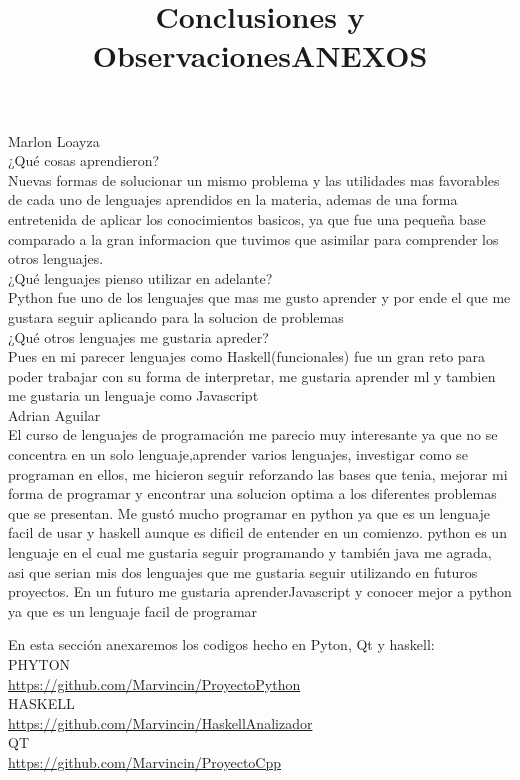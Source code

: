 \documentclass[12pt]{extbook}
\begin{document}
\newpage
\begin{center}
\title{Conclusiones y Observaciones}\maketitle
\end{center}
Marlon Loayza\\
¿Qué cosas aprendieron?\\
Nuevas formas de solucionar un mismo problema y las utilidades mas favorables de cada uno de 
lenguajes aprendidos en la materia, ademas de una forma entretenida de aplicar los conocimientos
basicos, ya que fue una pequeña base comparado a la gran informacion que tuvimos que asimilar
para comprender los otros lenguajes.\\
¿Qué lenguajes pienso utilizar en adelante?\\
Python fue uno de los lenguajes que mas me gusto aprender y por ende el que me gustara seguir
aplicando para la solucion de problemas\\
¿Qué otros lenguajes me gustaria apreder?\\
Pues en mi parecer lenguajes como Haskell(funcionales) fue un gran reto para poder trabajar
con su forma de interpretar, me gustaria aprender ml y tambien me gustaria un lenguaje como
Javascript\\

Adrian Aguilar\\ 
El curso de lenguajes de programación me parecio muy interesante ya que no se concentra en un solo lenguaje,aprender varios lenguajes, investigar como se programan en ellos, me hicieron seguir reforzando  las bases que tenia, mejorar mi forma de programar y encontrar una solucion optima a los diferentes problemas que se presentan.
Me gustó mucho programar en python ya que es un lenguaje facil de usar y haskell aunque es dificil de entender en un comienzo.
python es un lenguaje en el cual me gustaria seguir programando y también java me agrada, asi que serian mis dos lenguajes que me gustaria seguir utilizando en futuros proyectos.
En un futuro me gustaria aprenderJavascript y conocer mejor a python ya que es un lenguaje facil de programar


\newpage
\begin{center}
\title{ANEXOS}\maketitle
\end{center}
En esta sección anexaremos los codigos hecho en Pyton, Qt y haskell:\\
PHYTON\\
\href{https://github.com/Marvincin/ProyectoPython}{https://github.com/Marvincin/ProyectoPython}\\
HASKELL\\
\href{https://github.com/Marvincin/Haskell_Analizador}{https://github.com/Marvincin/HaskellAnalizador}\\
QT\\
\href{https://github.com/Marvincin/ProyectoCpp}{https://github.com/Marvincin/ProyectoCpp}\\
\end{document}
